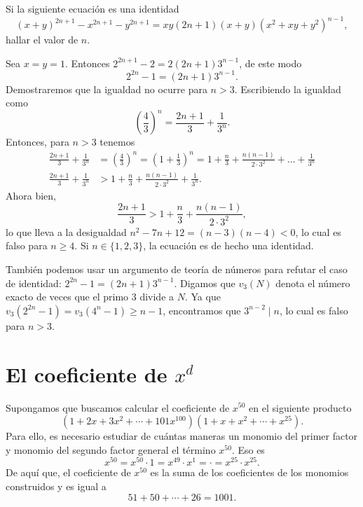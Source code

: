 \begin{example}
    Si la siguiente ecuación es una identidad
    \[
        (x + y)^{2n + 1} - x^{2n + 1} - y^{2n + 1} = xy(2n + 1)(x + y)(x^2 + xy + y^2)^{n -1},
    \]
    hallar el valor de $n$.
\end{example}
\begin{solution}
    Sea $x = y = 1$.
    Entonces $2^{2n + 1} - 2 = 2(2n + 1)3^{n - 1}$, de este modo
    \[
        2^{2n} - 1 = (2n + 1) 3^{n - 1}.
    \]
    Demostraremos que la igualdad no ocurre para $n > 3$.
    Escribiendo la igualdad como
    \[
        \left(\frac{4}{3}\right)^n = \frac{2n + 1}{3} + \frac{1}{3^n}.
    \]
    Entonces, para $n > 3$ tenemos
    \begin{align*}
        \frac{2n + 1}{3} + \frac{1}{3^n} &= \left(\frac{4}{3}\right)^n
        = \left(1 + \frac{1}{3}\right)^n
        = 1 + \frac{n}{3} + \frac{n (n - 1)}{2\cdot 3^2} + \ldots + \frac{1}{3^n}\\[2mm]
        \frac{2n + 1}{3} + \frac{1}{3^n} & > 1 + \frac{n}{3} + \frac{n (n - 1)}{2\cdot 3^2} + \frac{1}{3^n}.
    \end{align*}
    Ahora bien,
    \[
        \frac{2n + 1}{3} > 1 + \frac{n}{3} + \frac{n (n - 1)}{2\cdot 3^2},
    \]
    lo que lleva a la desigualdad $n^2 - 7n + 12 = (n - 3)(n - 4) < 0$, lo cual es falso para $n \geq 4$.
    Si $n \in \{1, 2, 3\}$, la ecuación es de hecho una identidad.
\end{solution}

\begin{note}
    También podemos usar un argumento de teoría de números para refutar el caso de identidad: $2^{2n} - 1 = (2n + 1) 3^{n -1}$.
    Digamos que $v_3(N)$ denota el número exacto de veces que el primo 3 divide a $N$.
    Ya que $v_3(2^{2n} - 1) = v_3(4^n - 1) \geq n - 1$, encontramos que $3^{n - 2} \mid n$, lo cual es falso para $n > 3$.
\end{note}





\section{El coeficiente de $x^d$}

Supongamos que buscamos calcular el coeficiente de $x^{50}$ en el siguiente producto
\[
    (1 + 2x + 3x^2 + \cdots + 101x^{100})(1 + x + x^2 + \cdots + x^{25}).
\]
Para ello, es necesario estudiar de cuántas maneras un monomio del primer factor y monomio del segundo factor general el término $x^{50}$.
Eso es
\[
    x^{50} = x^{50} \cdot 1 = x^{49} \cdot x^1 = \cdot = x^{25} \cdot x^{25}.
\]
De aquí que, el coeficiente de $x^{50}$ es la suma de los coeficientes de los monomios construidos y es igual a
\[
    51 + 50 + \cdots + 26 = 1001.
\]

